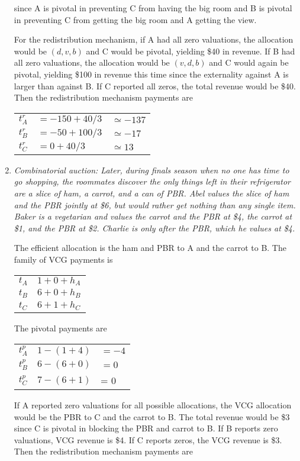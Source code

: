 \documentclass[letter, 10pt]{article}
\theoremstyle{basic}
\begin{document}
\begin{spacing}{1.0}
\begin{enumerate}
  since A is pivotal in preventing C from having the big room and B is
  pivotal in preventing C from getting the big room and A getting the
  view.

  For the redistribution mechanism, if A had all zero valuations, the
  allocation would be $(d, v, b)$ and C would be pivotal, yielding \$40 in
  revenue. If B had all zero valuations, the allocation would be $(v, d,
  b)$ and C would again be pivotal, yielding \$100 in revenue this time
  since the externality against A is larger than against B. If C reported
  all zeros, the total revenue would be \$40. Then the redistribution
  mechanism payments are

  \begin{tabular}{lll}
    $t_A^r$ & $= -150 + 40/3$ & $\simeq -137$ \\
    $t_B^r$ & $= -50 + 100/3$ & $\simeq -17$ \\
    $t_C^r$ & $= 0 + 40/3$ & $\simeq 13$
  \end{tabular}

\item \textit{Combinatorial auction: Later, during finals season when no
    one has time to go shopping, the roommates discover the only things
    left in their refrigerator are a slice of ham, a carrot, and a can of
    PBR. Abel values the slice of ham and the PBR jointly at \$6, but
    would rather get nothing than any single item. Baker is a vegetarian
    and values the carrot and the PBR at \$4, the carrot at \$1, and the
    PBR at \$2. Charlie is only after the PBR, which he values at \$4.}

  The efficient allocation is the ham and PBR to A and the carrot to
  B. The family of VCG payments is

  \begin{tabular}{ll}
    $t_A$ & $1 + 0 + h_A$ \\
    $t_B$ & $6 + 0 + h_B$ \\
    $t_C$ & $6 + 1 + h_C$
  \end{tabular}

  The pivotal payments are

  \begin{tabular}{lll}
    $t_A^p$ & $1 - (1 + 4)$ & $= -4$ \\
    $t_B^p$ & $6 - (6 + 0)$ & $= 0$ \\
    $t_C^p$ & $7 - (6 + 1)$ &= 0
  \end{tabular}

  If A reported zero valuations for all possible allocations, the VCG
  allocation would be the PBR to C and the carrot to B. The total revenue
  would be \$3 since C is pivotal in blocking the PBR and carrot to
  B. If B reports zero valuations, VCG revenue is \$4. If C reports zeros,
  the VCG revenue is \$3. Then the redistribution mechanism payments are


\end{enumerate}
\end{spacing}
\end{document}
